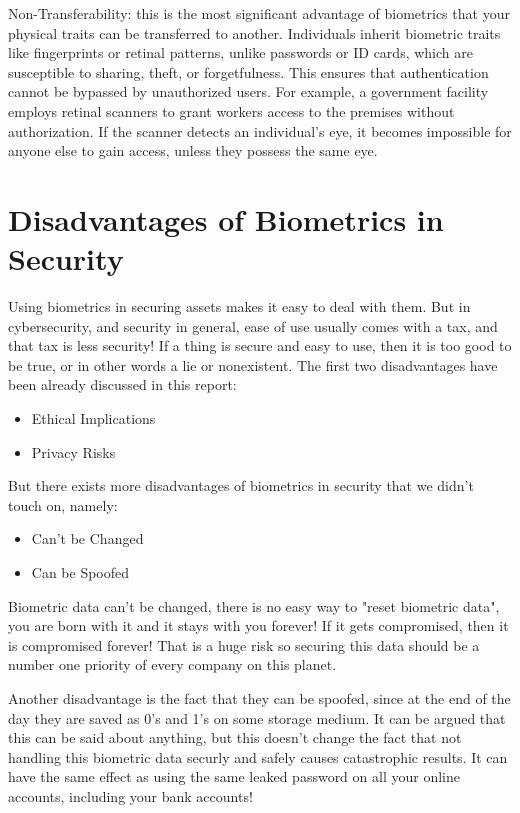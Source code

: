\documentclass[conference]{IEEEtran}
\begin{document}
Non-Transferability: this is the most significant advantage of biometrics that your physical traits can be transferred to another. Individuals inherit biometric traits like fingerprints or retinal patterns, unlike passwords or ID cards, which are susceptible to sharing, theft, or forgetfulness. This ensures that authentication cannot be bypassed by unauthorized users. For example, a government facility employs retinal scanners to grant workers access to the premises without authorization. If the scanner detects an individual's eye, it becomes impossible for anyone else to gain access, unless they possess the same eye.


\section{Disadvantages of Biometrics in Security}

Using biometrics in securing assets makes it easy to deal with them. But in cybersecurity, and security in general, ease of use usually comes with a tax, and that tax is less security! If a thing is secure and easy to use, then it is too good to be true, or in other words a lie or nonexistent. The first two disadvantages have been already discussed in this report:
\begin{itemize}
    \item Ethical Implications
    \item Privacy Risks
\end{itemize}

But there exists more disadvantages of biometrics in security that we didn't touch on, namely:
\begin{itemize}
    \item Can't be Changed
    \item Can be Spoofed
\end{itemize}

Biometric data can't be changed, there is no easy way to "reset biometric data", you are born with it and it stays with you forever! If it gets compromised, then it is compromised forever! That is a huge risk so securing this data should be a number one priority of every company on this planet.

Another disadvantage is the fact that they can be spoofed, since at the end of the day they are saved as 0's and 1's on some storage medium. It can be argued that this can be said about anything, but this doesn't change the fact that not handling this biometric data securly and safely causes catastrophic results. It can have the same effect as using the same leaked password on all your online accounts, including your bank accounts!
\end{document}
